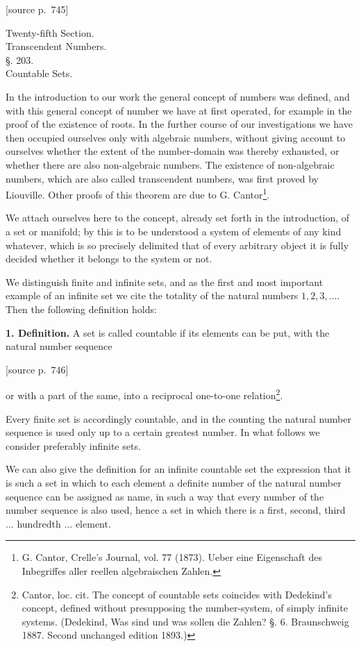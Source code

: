 \documentclass[11pt]{article}
\newcommand{\srcpage}[1]{\par\medskip\noindent\textsf{[source p.~#1]}\par\smallskip}
\begin{document}
\srcpage{745}
\begin{center}
{\large Twenty-fifth Section.}\\[0.8em]
{\Large Transcendent Numbers.}\\[1.2em]
{\large §. 203.}\\[0.4em]
{\large Countable Sets.}
\end{center}

In the introduction to our work the general concept of numbers was defined, and with this general concept of number we have at first operated, for example in the proof of the existence of roots. In the further course of our investigations we have then occupied ourselves only with algebraic numbers, without giving account to ourselves whether the extent of the number-domain was thereby exhausted, or whether there are also non-algebraic numbers. The existence of non-algebraic numbers, which are also called transcendent numbers, was first proved by Liouville. Other proofs of this theorem are due to G. Cantor\footnote{G. Cantor, Crelle's Journal, vol. 77 (1873). Ueber eine Eigenschaft des Inbegriffes aller reellen algebraischen Zahlen.}.

We attach ourselves here to the concept, already set forth in the introduction, of a set or manifold; by this is to be understood a system of elements of any kind whatever, which is so precisely delimited that of every arbitrary object it is fully decided whether it belongs to the system or not.

We distinguish finite and infinite sets, and as the first and most important example of an infinite set we cite the totality of the natural numbers $1,2,3,\ldots$. Then the following definition holds:

\textbf{1. Definition.} A set is called countable if its elements can be put, with the natural number sequence
\srcpage{746}
or with a part of the same, into a reciprocal one-to-one relation\footnote{Cantor, loc. cit. The concept of countable sets coincides with Dedekind's concept, defined without presupposing the number-system, of simply infinite systems. (Dedekind, Was sind und was sollen die Zahlen? §. 6. Braunschweig 1887. Second unchanged edition 1893.)}.

Every finite set is accordingly countable, and in the counting the natural number sequence is used only up to a certain greatest number. In what follows we consider preferably infinite sets.

We can also give the definition for an infinite countable set the expression that it is such a set in which to each element a definite number of the natural number sequence can be assigned as name, in such a way that every number of the number sequence is also used, hence a set in which there is a first, second, third $\ldots$ hundredth $\ldots$ element.
\end{document}
